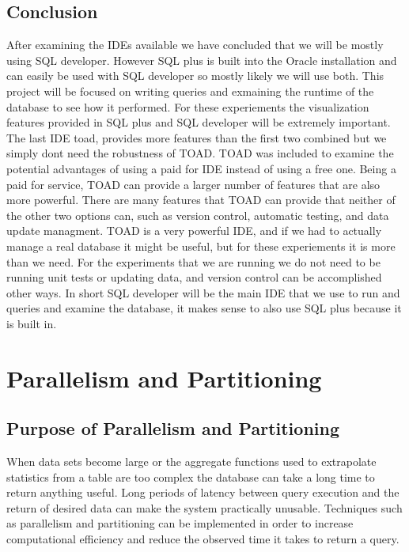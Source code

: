 \documentclass[draftclsnofoot, onecolumn, compsoc, 10pt]{IEEEtran}
\begin{document}
\subsection{Conclusion}
After examining the IDEs available we have concluded that we will be mostly using SQL developer.
However SQL plus is built into the Oracle installation and can easily be used with SQL developer so mostly likely we will use both.
This project will be focused on writing queries and exmaining the runtime of the database to see how it performed.
For these experiements the visualization features provided in SQL plus and SQL developer will be extremely important.
The last IDE toad, provides more features than the first two combined but we simply dont need the robustness of TOAD.
TOAD was included to examine the potential advantages of using a paid for IDE instead of using a free one. 
Being a paid for service, TOAD can provide a larger number of features that are also more powerful.
There are many features that TOAD can provide that neither of the other two options can, such as version control, automatic testing, and data update managment.
TOAD is a very powerful IDE, and if we had to actually manage a real database it might be useful, but for these experiements it is more than we need.
For the experiments that we are running we do not need to be running unit tests or updating data, and version control can be accomplished other ways.
In short SQL developer will be the main IDE that we use to run and queries and examine the database, it makes sense to also use SQL plus because it is built in. 

\section{Parallelism and Partitioning}

\subsection{Purpose of Parallelism and Partitioning}
When data sets become large or the aggregate functions used to extrapolate statistics from a table are too complex the database can take a long time to return anything useful.
Long periods of latency between query execution and the return of desired data can make the system practically unusable. 
Techniques such as parallelism and partitioning can be implemented in order to increase computational efficiency and reduce the observed time it takes to return a query. 
\end{document}
